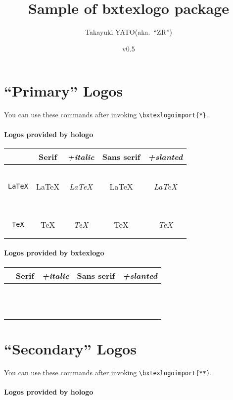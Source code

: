 \documentclass[a4paper]{article}
\newcommand{\PkgVersion}{0.5}
\newcommand{\PkgDate}{2021/11/11}
\newcommand{\Pkg}[1]{\textsf{#1}}
\newenvironment{LogoSamples}{%
  \begin{center}\begin{tabular}{ccccc}
    \hline \phantom{\LARGE I}
        & \textrm{Serif} & \textit{+italic}
        & \textsf{Sans serif} & \textsl{+slanted}
    \\\hline
}{%
    \hline
  \end{tabular}\end{center}
}
\newcommand*{\LSEntry}[1]{%
  \texttt{\string#1} & \textrm{#1} & \textit{#1}
      & \textsf{#1} & \textsf{\textsl{#1}}
  \\}
\begin{document}
\title{Sample of \Pkg{bxtexlogo} package}
\author{Takayuki YATO\quad (aka.~``ZR'')}
\date{v\PkgVersion \quad[\PkgDate]}
\maketitle

\section{``Primary'' Logos}

You can use these commands after invoking
\verb|\bxtexlogoimport{*}|.

\paragraph{Logos provided by \Pkg{hologo}}\mbox{}

\begin{LogoSamples}
\LSEntry{\AmSLaTeX}
\LSEntry{\AmSTeX}
\LSEntry{\BibTeX}
\LSEntry{\ConTeXt}
\LSEntry{\eTeX}
\LSEntry{\LaTeX}
\LSEntry{\LaTeXe}
\LSEntry{\LuaLaTeX}
\LSEntry{\LuaTeX}
\LSEntry{\LyX}
\LSEntry{\METAFONT}
\LSEntry{\METAPOST}
\LSEntry{\pdfTeX}
\LSEntry{\pdfLaTeX}
\LSEntry{\TeX}
\LSEntry{\XeLaTeX}
\LSEntry{\XeTeX}
\end{LogoSamples}

\paragraph{Logos provided by \Pkg{bxtexlogo}}\mbox{}

\begin{LogoSamples}
\LSEntry{\epTeX}
\LSEntry{\eupTeX}
\LSEntry{\JBibTeX}
\LSEntry{\pBibTeX}
\LSEntry{\pLaTeXe}
\LSEntry{\pLaTeX}
\LSEntry{\pTeX}
\LSEntry{\TikZ}
\LSEntry{\upBibTeX}
\LSEntry{\upLaTeX}
\LSEntry{\upLaTeXe}
\LSEntry{\upTeX}
\end{LogoSamples}

\newpage
\section{``Secondary'' Logos}

You can use these commands after invoking
\verb|\bxtexlogoimport{**}|.

\paragraph{Logos provided by \Pkg{hologo}}\mbox{}
\end{document}
